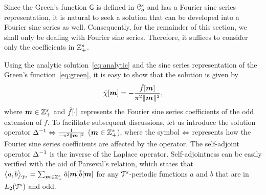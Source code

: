 Since the Green's function $\mathsf{G}$ is defined in $\mathcal{C}_o^s$ and has a
Fourier sine series representation, it is natural to seek a solution
that can be developed into a Fourier sine series as
well. Consequently, for the remainder of this section, we shall only
be dealing with Fourier sine series. Therefore, it suffices to
consider only the coefficients in $\mathbb{Z}^s_+$.

Using the analytic solution~\eqref{eq:analytic} and the sine series
representation of the Green's function~\eqref{eq:green}, it is easy to show that
the solution is given by
\begin{equation}
  \st{\chi}[\vect{m}] = -
  \frac{\st{f}[\vect{m}]}{\pi^2 \norm{\vect{m}}^2},
\label{eq:fourierSolution}
\end{equation}
where $\boldsymbol{m} \in \mathbb{Z}^s_+$ and $\tilde{f}[\cdot]$ represents the Fourier
sine series coefficients of the odd extension of $f$. To facilitate subsequent
discussions, let us introduce the solution operator
$\mathop{\Delta^{-1}} \Leftrightarrow \frac{1}{-\pi^2 \lVert\boldsymbol{m}\rVert^2}$  ($\boldsymbol{m} \in
\mathbb{Z}^s_+$), where the symbol $\Leftrightarrow$ represents how the Fourier sine
series coefficients are affected by the operator.
The self-adjoint operator $\mathop{\Delta^{-1}}$ is the inverse of the Laplace
operator. Self-adjointness can be easily verified with
the aid of Parseval's relation, which states that
$
  \bigl \langle a , b \bigr \rangle_{\mathcal{T}^s} = \sum_{\boldsymbol{m} \in \mathbb{Z}^s_+} \tilde{a}[\boldsymbol{m}]
  \tilde{b}[\boldsymbol{m}] 
$
for any $\mathcal{T}^s$-periodic functions $a$ and $b$ that are in
$L_2(\mathcal{T}^s)$ and odd.


